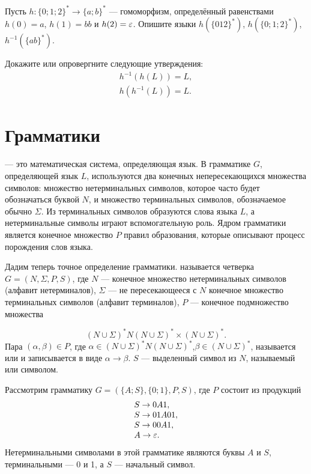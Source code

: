 \begin{myproblem}
Пусть $h\colon \{0;1;2\}^*\to\{a;b\}^*$ --- гомоморфизм, определённый равенствами $h(0)=a$, $h(1)=bb$ и $h(2)=\varepsilon$. Опишите языки $h(\{012\}^*)$, $h(\{0;1;2\}^*)$, $h^{-1}(\{ab\}^*)$.
\end{myproblem}


\begin{myproblem}
Докажите или опровергните следующие утверждения:
\begin{gather*}
h^{-1}(h(L))=L, \\
h(h^{-1}(L))=L.
\end{gather*}
\end{myproblem}

\section{Грамматики}
\label{Chapter1Grammars}

 --- это математическая система, определяющая язык.
В грамматике $G$, определяющей язык $L$, используются два конечных непересекающихся множества символов: множество нетерминальных символов, которое часто будет обозначаться буквой $N$, и множество терминальных символов, обозначаемое обычно $\Sigma$. Из терминальных символов образуются слова языка $L$, а нетерминальные символы играют вспомогательную роль. Ядром грамматики является конечное множество $P$ правил образования, которые описывают процесс порождения слов языка.

Дадим теперь точное определение грамматики.  называется четверка $G=(N,\Sigma,P,S)$, где $N$ --- конечное множество нетерминальных символов (алфавит нетерминалов), $\Sigma$ --- не пересекающееся с $N$ конечное множество терминальных символов (алфавит терминалов), $P$ --- конечное подмножество множества

\[
	(N\cup\Sigma)^*N(N\cup\Sigma)^* \times (N\cup\Sigma)^*.
\]
Пара $(\alpha,\beta)\in P$, где $\alpha\in(N\cup\Sigma)^*N(N\cup\Sigma)^*$,$\beta\in(N\cup\Sigma)^*$, называется  или  и записывается в виде $\alpha\to\beta$. $S$ --- выделенный символ из $N$, называемый  или
 символом.

\begin{myexample}
\label{example11}
Рассмотрим грамматику $G=(\{A;S\},\{0;1\},P,S)$, где $P$ состоит из продукций
\begin{equation}
\begin{array}{l}
	S \to 0A1,  \\
	S \to 01A01,\\
	S \to 00A1, \\
	A \to \varepsilon.
\end{array}
\end{equation}
Нетерминальными символами в этой грамматике являются буквы $A$ и $S$, терминальными --- 0 и 1, а $S$ --- начальный символ.
\end{myexample}

